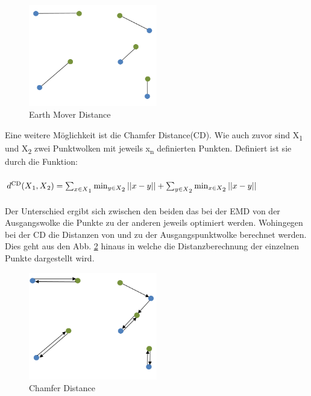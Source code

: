 \documentclass{llncs}
\begin{document}
\begin{figure}[htbp] 
	\centering
	\includegraphics[width=0.5\textwidth]{emd_distance.png}
	\caption{Earth Mover Distance}
	\label{fig:Bild9}
\end{figure}
		
Eine weitere Möglichkeit ist die Chamfer Distance(CD). Wie auch zuvor sind  X\textsubscript{1} und X\textsubscript{2} zwei Punktwolken mit jeweils x\textsubscript{n} definierten Punkten\cite{autoencoderloss}. Definiert ist sie durch die Funktion:
\\\\
\begin{math}
d\textsuperscript{CD}(X\textsubscript{1},X\textsubscript{2})=\sum_{x\in X\textsubscript{1}} \min_{y \in X\textsubscript{2}}||x-y|| + \sum_{y\in X\textsubscript{2}} \min_{x \in X\textsubscript{2}}||x-y||
\end{math}
\\\\
Der Unterschied ergibt sich zwischen den beiden das bei der EMD von der Ausgangswolke die Punkte zu der anderen jeweils optimiert werden. Wohingegen bei der CD die Distanzen von und zu der Ausgangspunktwolke berechnet werden. Dies geht aus den Abb. \ref{fig:Bild10} hinaus in welche die Distanzberechnung der einzelnen Punkte dargestellt wird\cite{autoencoderloss}.

\begin{figure}[htbp] 
	\centering
	\includegraphics[width=0.5\textwidth]{champfer.png}
	\caption{Chamfer Distance}
	\label{fig:Bild10}
\end{figure} 
\newpage
\end{document}
